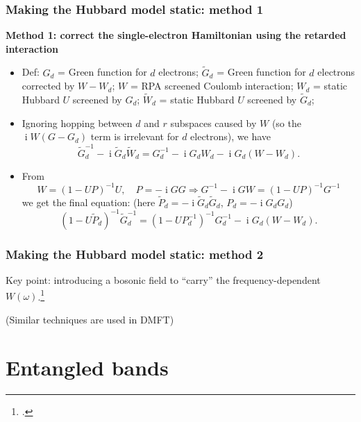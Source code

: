 \documentclass{beamer}
\DeclareMathOperator{\ii}{i}
\begin{document}
\begin{frame}
\frametitle{Making the Hubbard model static: method 1}

\textbf{Method 1: correct the single-electron Hamiltonian using the retarded interaction}

\begin{itemize}
    \item Def: $G_d$ = Green function for $d$ electrons; 
        $\tilde{G}_d$ = Green function for $d$ electrons corrected by $W - W_d$; 
        $W$ = RPA screened Coulomb interaction; 
        $W_d$ = static Hubbard $U$ screened by $G_d$; 
        $\tilde{W}_d$ = static Hubbard $U$ screened by $\tilde{G}_d$;
    \item Ignoring hopping between $d$ and $r$ subspaces caused by $W$
        (so the $\ii W (G - G_d)$ term is irrelevant for $d$ electrons), we have 
        \begin{equation}
            \tilde{G}_d^{-1} - \ii \tilde{G}_d \tilde{W}_d = 
            G_d^{-1} - \ii G_d W_d - \ii G_d (W - W_d).
        \end{equation}
    \item  From
    \begin{equation}
        W = (1 - UP)^{-1} U, \quad P = - \ii G G \Rightarrow
        G^{-1} - \ii GW = (1 - UP)^{-1} G^{-1} 
    \end{equation} 
    we get the final equation: 
    (here $\tilde{P}_d = - \ii \tilde{G}_d \tilde{G}_d$, 
    $P_d = - \ii G_d G_d$)
    \begin{equation}
            (1 - U \tilde{P}_d)^{-1} \tilde{G}_d^{-1}
            = (1 - U P_d^{-1})^{-1} G_d^{-1}
            - \ii G_d  (W -W_d).
        \end{equation}
\end{itemize}

\end{frame}

\begin{frame}
\frametitle{Making the Hubbard model static: method 2}

Key point: introducing a bosonic field 
to ``carry'' the frequency-dependent $W(\omega)$.\footcite{PhysRevLett.109.126408}

(Similar techniques are used in DMFT)

\end{frame}

\section{Entangled bands}
\end{document}
